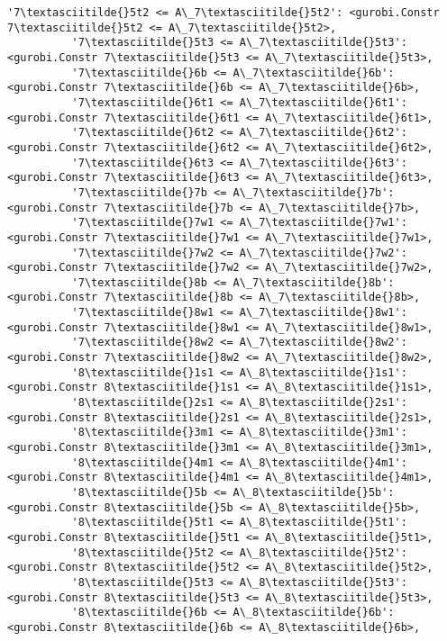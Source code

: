 \documentclass[11pt]{article}
\begin{document}
\begin{Verbatim}[commandchars=\\\{\}]
          '7\textasciitilde{}5t2 <= A\_7\textasciitilde{}5t2': <gurobi.Constr 7\textasciitilde{}5t2 <= A\_7\textasciitilde{}5t2>,
          '7\textasciitilde{}5t3 <= A\_7\textasciitilde{}5t3': <gurobi.Constr 7\textasciitilde{}5t3 <= A\_7\textasciitilde{}5t3>,
          '7\textasciitilde{}6b <= A\_7\textasciitilde{}6b': <gurobi.Constr 7\textasciitilde{}6b <= A\_7\textasciitilde{}6b>,
          '7\textasciitilde{}6t1 <= A\_7\textasciitilde{}6t1': <gurobi.Constr 7\textasciitilde{}6t1 <= A\_7\textasciitilde{}6t1>,
          '7\textasciitilde{}6t2 <= A\_7\textasciitilde{}6t2': <gurobi.Constr 7\textasciitilde{}6t2 <= A\_7\textasciitilde{}6t2>,
          '7\textasciitilde{}6t3 <= A\_7\textasciitilde{}6t3': <gurobi.Constr 7\textasciitilde{}6t3 <= A\_7\textasciitilde{}6t3>,
          '7\textasciitilde{}7b <= A\_7\textasciitilde{}7b': <gurobi.Constr 7\textasciitilde{}7b <= A\_7\textasciitilde{}7b>,
          '7\textasciitilde{}7w1 <= A\_7\textasciitilde{}7w1': <gurobi.Constr 7\textasciitilde{}7w1 <= A\_7\textasciitilde{}7w1>,
          '7\textasciitilde{}7w2 <= A\_7\textasciitilde{}7w2': <gurobi.Constr 7\textasciitilde{}7w2 <= A\_7\textasciitilde{}7w2>,
          '7\textasciitilde{}8b <= A\_7\textasciitilde{}8b': <gurobi.Constr 7\textasciitilde{}8b <= A\_7\textasciitilde{}8b>,
          '7\textasciitilde{}8w1 <= A\_7\textasciitilde{}8w1': <gurobi.Constr 7\textasciitilde{}8w1 <= A\_7\textasciitilde{}8w1>,
          '7\textasciitilde{}8w2 <= A\_7\textasciitilde{}8w2': <gurobi.Constr 7\textasciitilde{}8w2 <= A\_7\textasciitilde{}8w2>,
          '8\textasciitilde{}1s1 <= A\_8\textasciitilde{}1s1': <gurobi.Constr 8\textasciitilde{}1s1 <= A\_8\textasciitilde{}1s1>,
          '8\textasciitilde{}2s1 <= A\_8\textasciitilde{}2s1': <gurobi.Constr 8\textasciitilde{}2s1 <= A\_8\textasciitilde{}2s1>,
          '8\textasciitilde{}3m1 <= A\_8\textasciitilde{}3m1': <gurobi.Constr 8\textasciitilde{}3m1 <= A\_8\textasciitilde{}3m1>,
          '8\textasciitilde{}4m1 <= A\_8\textasciitilde{}4m1': <gurobi.Constr 8\textasciitilde{}4m1 <= A\_8\textasciitilde{}4m1>,
          '8\textasciitilde{}5b <= A\_8\textasciitilde{}5b': <gurobi.Constr 8\textasciitilde{}5b <= A\_8\textasciitilde{}5b>,
          '8\textasciitilde{}5t1 <= A\_8\textasciitilde{}5t1': <gurobi.Constr 8\textasciitilde{}5t1 <= A\_8\textasciitilde{}5t1>,
          '8\textasciitilde{}5t2 <= A\_8\textasciitilde{}5t2': <gurobi.Constr 8\textasciitilde{}5t2 <= A\_8\textasciitilde{}5t2>,
          '8\textasciitilde{}5t3 <= A\_8\textasciitilde{}5t3': <gurobi.Constr 8\textasciitilde{}5t3 <= A\_8\textasciitilde{}5t3>,
          '8\textasciitilde{}6b <= A\_8\textasciitilde{}6b': <gurobi.Constr 8\textasciitilde{}6b <= A\_8\textasciitilde{}6b>,

\end{Verbatim}
\end{document}

